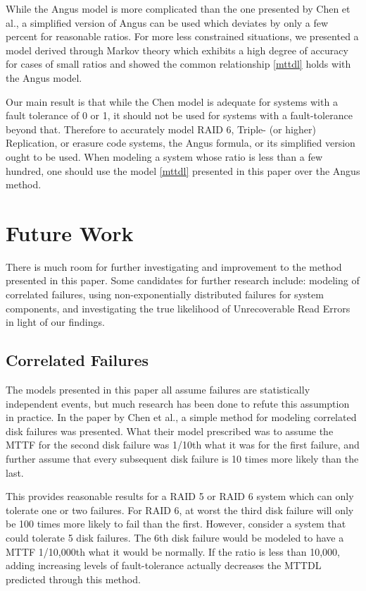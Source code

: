 \documentclass[XXX,endnotes]{usetex-v1}
\begin{document}
While the Angus model is more complicated than the one presented by Chen et al., a simplified version of Angus can be used which deviates by only a few percent for reasonable  ratios. For more less constrained situations, we presented a model derived through Markov theory which exhibits a high degree of accuracy for cases of small  ratios and showed the common relationship \eqref{mttdl} holds with the Angus model.

Our main result is that while the Chen model is adequate for systems with a fault tolerance of 0 or 1, it should not be used for systems with a fault-tolerance beyond that.  Therefore to accurately model RAID 6, Triple- (or higher) Replication, or erasure code systems, the Angus formula, or its simplified version ought to be used.  When modeling a system whose  ratio is less than a few hundred, one should use the model \eqref{mttdl} presented in this paper over the Angus method.

\section{Future Work}

There is much room for further investigating and improvement to the method presented in this paper.  Some candidates for further research include: modeling of correlated failures, using non-exponentially distributed failures for system components, and investigating the true likelihood of Unrecoverable Read Errors in light of our findings.

\subsection{Correlated Failures}

The models presented in this paper all assume failures are statistically independent events, but much research has been done to refute this assumption in practice\cite{weibull}.  In the paper by Chen et al., a simple method for modeling correlated disk failures was presented\cite{reliability}.  What their model prescribed was to assume the MTTF for the second disk failure was 1/10th what it was for the first failure, and further assume that every subsequent disk failure is 10 times more likely than the last.

This provides reasonable results for a RAID 5 or RAID 6 system which can only tolerate one or two failures.  For RAID 6, at worst the third disk failure will only be 100 times more likely to fail than the first.  However, consider a system that could tolerate 5 disk failures.  The 6th disk failure would be modeled to have a MTTF 1/10,000th what it would be normally.  If the  ratio is less than 10,000, adding increasing levels of fault-tolerance actually decreases the MTTDL predicted through this method.
\end{document}
